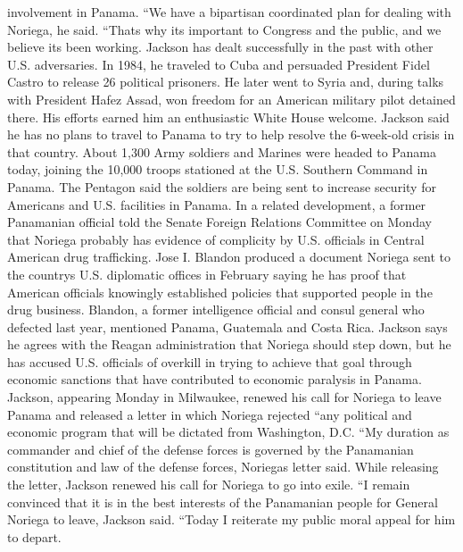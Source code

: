 \documentclass{article}
\begin{document}
involvement in Panama. ``We have a bipartisan coordinated plan for dealing with Noriega, he said. ``Thats why its important to Congress and the public, and we believe its been working. Jackson has dealt successfully in the past with other U.S. adversaries. In 1984, he traveled to Cuba and persuaded President Fidel Castro to release 26 political prisoners. He later went to Syria and, during talks with President Hafez Assad, won freedom for an American military pilot detained there. His efforts earned him an enthusiastic White House welcome. Jackson said he has no plans to travel to Panama to try to help resolve the 6-week-old crisis in that country. About 1,300 Army soldiers and Marines were headed to Panama today, joining the 10,000 troops stationed at the U.S. Southern Command in Panama. The Pentagon said the soldiers are being sent to increase security for Americans and U.S. facilities in Panama. In a related development, a former Panamanian official told the Senate Foreign Relations Committee on Monday that Noriega probably has evidence of complicity by U.S. officials in Central American drug trafficking. Jose I. Blandon produced a document Noriega sent to the countrys U.S. diplomatic offices in February saying he has proof that American officials knowingly established policies that supported people in the drug business. Blandon, a former intelligence official and consul general who defected last year, mentioned Panama, Guatemala and Costa Rica. Jackson says he agrees with the Reagan administration that Noriega should step down, but he has accused U.S. officials of overkill in trying to achieve that goal through economic sanctions that have contributed to economic paralysis in Panama. Jackson, appearing Monday in Milwaukee, renewed his call for Noriega to leave Panama and released a letter in which Noriega rejected ``any political and economic program that will be dictated from Washington, D.C. ``My duration as commander and chief of the defense forces is governed by the Panamanian constitution and law of the defense forces, Noriegas letter said. While releasing the letter, Jackson renewed his call for Noriega to go into exile. ``I remain convinced that it is in the best interests of the Panamanian people for General Noriega to leave, Jackson said. ``Today I reiterate my public moral appeal for him to depart. 
\end{document}
